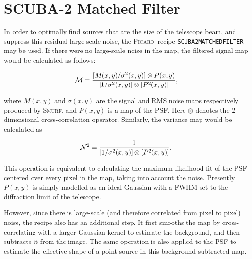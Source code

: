 \documentclass[twoside,11pt]{article}
\newcommand{\xref}[3]{#1}
\newcommand{\xlabel}[1]{}
\renewcommand{\_}{\texttt{\symbol{95}}}
\newcommand{\picard}{\xref{\textsc{Picard}}{sun265}{}}
\newcommand{\smurf}{\xref{\textsc{Smurf}}{sun258}{}}
\newcommand{\drrecipe}[1]{\texttt{#1}}
\begin{document}
\section{\xlabel{matchedfilter}SCUBA-2 Matched Filter}
\label{app:mf}

In order to optimally find sources that are the size of the telescope
beam, and suppress this residual large-scale noise, the \picard\
recipe \drrecipe{SCUBA2\_MATCHED\_FILTER} may be used. If there were
no large-scale noise in the map, the filtered signal map would be
calculated as follows:

\begin{equation}
  {\cal{M}} = \frac{[M(x,y)/\sigma^2(x,y)] \otimes P(x,y)}
  {[1/\sigma^2(x,y)] \otimes [P^2(x,y)]},
\end{equation}

where $M(x,y)$ and $\sigma(x,y)$ are the signal and RMS
noise maps respectively produced by \smurf, and $P(x,y)$ is a map of the
PSF. Here \(\otimes\) denotes the 2-dimensional cross-correlation
operator. Similarly, the variance map would be calculated as

\begin{equation}
  {\cal{N}}^2 = \frac{1}{[1/\sigma^2(x,y)] \otimes [P^2(x,y)]}.
\end{equation}

This operation is equivalent to calculating the maximum-likelihood fit
of the PSF centered over every pixel in the map, taking into account
the noise. Presently $P(x,y)$ is simply modelled as an ideal Gaussian
with a FWHM set to the diffraction limit of the telescope.

However, since there is large-scale (and therefore correlated from
pixel to pixel) noise, the recipe also has an additional step. It
first smooths the map by cross-correlating with a larger Gaussian
kernel to estimate the background, and then subtracts it from the
image. The same operation is also applied to the PSF to estimate the
effective shape of a point-source in this background-subtracted map.
\end{document}
